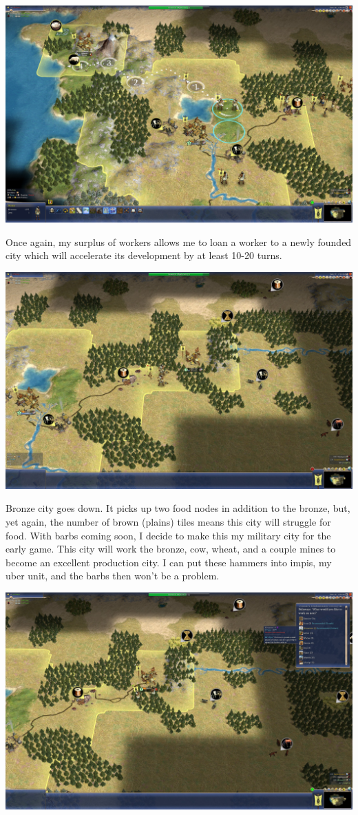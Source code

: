 \documentclass[10pt]{article}
\begin{document}
\includegraphics[width=1.0\textwidth]{26}

Once again, my surplus of workers allows me to loan a worker to a newly founded city which will accelerate
its development by at least 10-20 turns.

\includegraphics[width=1.0\textwidth]{27}

Bronze city goes down. It picks up two food nodes in addition to the bronze, but, yet again,
the number of brown (plains) tiles means this city will struggle for food. With barbs coming soon, I decide
to make this my military city for the early game. This city will work the bronze, cow, wheat, and a couple
mines to become an excellent production city. I can put these hammers into impis, my uber unit, and the barbs
then won't be a problem.

\includegraphics[width=1.0\textwidth]{30}
\end{document}
